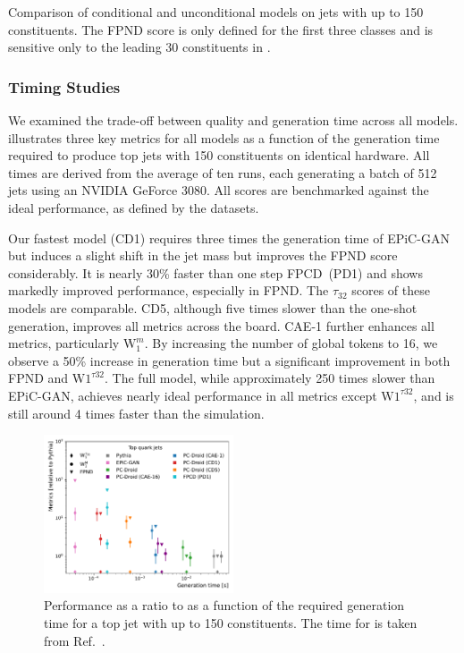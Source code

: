 \begin{table}[tp]
    \centering
    \renewcommand{\arraystretch}{1.5}
    \caption{Comparison of conditional and unconditional models on jets with up to 150 constituents. The FPND score is only defined for the first three classes and is sensitive only to the leading 30 constituents in \pt.
    }
    \label{tab:perf-150-unconditional}
    \resizebox{\textwidth}{!}{%
        
    }
\end{table}

\FloatBarrier

\subsubsection{Timing Studies}

We examined the trade-off between quality and generation time across all models.
 illustrates three key metrics for all models as a function of the generation time required to produce top jets with 150 constituents on identical hardware.
All times are derived from the average of ten runs, each generating a batch of 512 jets using an NVIDIA GeForce 3080.
All scores are benchmarked against the ideal performance, as defined by the \pythia datasets.

Our fastest model (CD1) requires three times the generation time of EPiC-GAN but induces a slight shift in the jet mass but improves the FPND score considerably.
It is nearly 30\% faster than one step FPCD~(PD1) and shows markedly improved performance, especially in FPND.
The $\tau_{32}$ scores of these models are comparable.
CD5, although five times slower than the one-shot generation, improves all metrics across the board.
CAE-1 further enhances all metrics, particularly $\mathrm{W}_1^m$.
By increasing the number of global tokens to 16, we observe a 50\% increase in generation time but a significant improvement in both FPND and $\mathrm{W}1^{\tau{32}}$.
The full \pcdroid model, while approximately 250 times slower than EPiC-GAN, achieves nearly ideal performance in all metrics except $\mathrm{W}1^{\tau{32}}$, and is still around 4 times faster than the \pythia simulation.

\begin{figure}[htbp]
    \centering
    \includegraphics[width=0.5\textwidth]{Figures/jet_generation/droid/150/metrics_vs_times/t/t_metrics_vs_times.pdf}
    \caption{Performance as a ratio to \pythia as a function of the required generation time for a top jet with up to 150 constituents. The time for \pythia is taken from Ref.~\cite{MPGAN}.}
    \label{fig:timing}
\end{figure}

